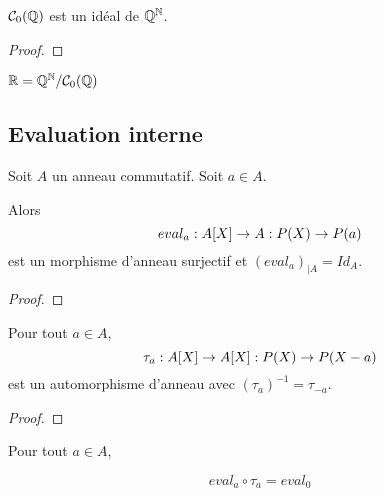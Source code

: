 \begin{proposition}
	$\mathcal{C}_{0}(\mathbb{Q})$ est un idéal de $\mathbb{Q}^{\mathbb{N}}$.
\end{proposition}

\ifdefined\outputproof
\begin{proof}

\end{proof}
\fi

\begin{definition}
	$\mathbb{R} = \mathbb{Q}^{\mathbb{N}} / \mathcal{C}_{0}(\mathbb{Q})$
\end{definition}

\subsection{Evaluation interne}

\begin{proposition}
	Soit $A$ un anneau commutatif. Soit $a \in A$.

	Alors
	\begin{equation}
		eval_{a} : A[X] \rightarrow A : P(X) \rightarrow P(a)
	\end{equation}
	est un morphisme d'anneau surjectif et ${(eval_{a})}_{|A} = Id_{A}$.
\end{proposition}

\ifdefined\outputproof
\begin{proof}

\end{proof}
\fi

\begin{proposition}
	Pour tout $a \in A$,
	\begin{equation}
		\tau_{a} : A[X] \rightarrow A[X] : P(X) \rightarrow P(X - a)
	\end{equation}
	est un automorphisme d'anneau avec $(\tau_{a})^{-1} = \tau_{-a}$.
\end{proposition}

\ifdefined\outputproof
\begin{proof}

\end{proof}
\fi

\begin{proposition}
	Pour tout $a \in A$,

	\begin{equation}
		eval_{a} \circ \tau_{a} = eval_{0}
	\end{equation}

\end{proposition}

